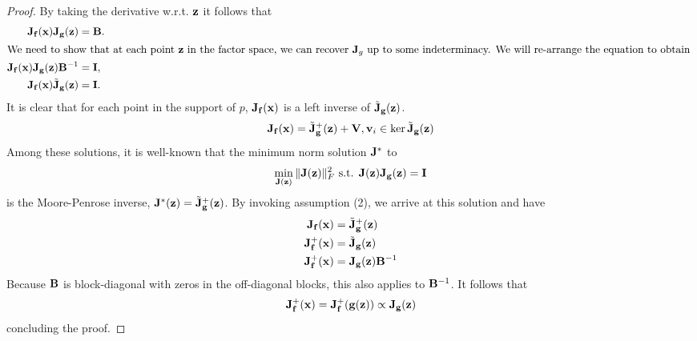 \begin{proof}
            By taking the derivative w.r.t. $\mathbf{z}$ it follows that
            \begin{align}
               \mathbf{J}_{\mathbf{f}}(\mathbf{x}) \mathbf{J}_{\mathbf{g}}(\mathbf{z}) &= \mathbf{B}. \\
               \intertext{We need to show that at each point $\mathbf{z}$ in the factor space, we can recover $\mathbf{J}_g$ up to some indeterminacy.
                    We will re-arrange the equation to obtain
               }
               \mathbf{J}_{\mathbf{f}}(\mathbf{x}) \mathbf{J}_{\mathbf{g}}(\mathbf{z}) \mathbf{B}^{-1} &= \mathbf{I}, \\
               \mathbf{J}_{\mathbf{f}}(\mathbf{x}) \tilde{\mathbf{J}}_{\mathbf{g}}(\mathbf{z}) &= \mathbf{I}.
            \end{align}
            It is clear that for each point in the support of $p$, $\mathbf{J}_{\mathbf{f}}(\mathbf{x})$ is a left inverse of $\tilde{\mathbf{J}}_{\mathbf{g}}(\mathbf{z})$. 
            \begin{equation}
                \mathbf{J}_{\mathbf{f}}(\mathbf{x}) = \tilde{\mathbf{J}}^+_{\mathbf{g}}(\mathbf{z}) + \mathbf{V}, \mathbf{v}_{i} \in \ker \tilde{\mathbf{J}}_{\mathbf{g}}(\mathbf{z})
                \label{eq:jf-jg-v}
            \end{equation}
            Among these solutions, it is well-known that the minimum norm solution $\mathbf{J}^*$ to
            \begin{equation}
                \min_{\mathbf{J}(\mathbf{z})} \| \mathbf{J}(\mathbf{z}) \|_F^2 \text{ s.t. } \mathbf{J}(\mathbf{z}) \mathbf{J}_{\mathbf{g}}(\mathbf{z})= \mathbf{I}
            \end{equation}
            is the Moore-Penrose inverse, $\mathbf{J}^*(\mathbf{z}) = \tilde{\mathbf{J}}^+_{\mathbf{g}}(\mathbf{z})$. By invoking assumption (2), we arrive at this solution and have
            \begin{align}
                \mathbf{J}_{\mathbf{f}}(\mathbf{x}) &= \tilde{\mathbf{J}}^+_{\mathbf{g}}(\mathbf{z}) \\
                \mathbf{J}^+_{\mathbf{f}}(\mathbf{x}) &= \tilde{\mathbf{J}}_{\mathbf{g}}(\mathbf{z}) \\
                \mathbf{J}^+_{\mathbf{f}}(\mathbf{x}) &= \mathbf{J}_{\mathbf{g}}(\mathbf{z}) \mathbf{B}^{-1}
            \end{align}
            Because $\mathbf{B}$ is block-diagonal with zeros in the off-diagonal blocks, this also applies to $\mathbf{B}^{-1}$.
            It follows that
            \begin{equation}
                \mathbf{J}^+_{\mathbf{f}}(\mathbf{x}) = \mathbf{J}^+_{\mathbf{f}}(\mathbf{g}(\mathbf{z})) \propto \mathbf{J}_{\mathbf{g}}(\mathbf{z})
            \end{equation}
            concluding the proof.
        \end{proof}


